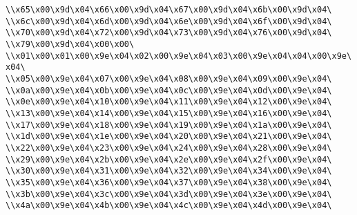 \verb|\\x65\x00\x9d\x04\x66\x00\x9d\x04\x67\x00\x9d\x04\x6b\x00\x9d\x04\|\newline
\verb|\\x6c\x00\x9d\x04\x6d\x00\x9d\x04\x6e\x00\x9d\x04\x6f\x00\x9d\x04\|\newline
\verb|\\x70\x00\x9d\x04\x72\x00\x9d\x04\x73\x00\x9d\x04\x76\x00\x9d\x04\|\newline
\verb|\\x79\x00\x9d\x04\x00\x00\|\newline
\verb|\\x01\x00\x01\x00\x9e\x04\x02\x00\x9e\x04\x03\x00\x9e\x04\x04\x00\x9e\x04\|\newline
\verb|\\x05\x00\x9e\x04\x07\x00\x9e\x04\x08\x00\x9e\x04\x09\x00\x9e\x04\|\newline
\verb|\\x0a\x00\x9e\x04\x0b\x00\x9e\x04\x0c\x00\x9e\x04\x0d\x00\x9e\x04\|\newline
\verb|\\x0e\x00\x9e\x04\x10\x00\x9e\x04\x11\x00\x9e\x04\x12\x00\x9e\x04\|\newline
\verb|\\x13\x00\x9e\x04\x14\x00\x9e\x04\x15\x00\x9e\x04\x16\x00\x9e\x04\|\newline
\verb|\\x17\x00\x9e\x04\x18\x00\x9e\x04\x19\x00\x9e\x04\x1a\x00\x9e\x04\|\newline
\verb|\\x1d\x00\x9e\x04\x1e\x00\x9e\x04\x20\x00\x9e\x04\x21\x00\x9e\x04\|\newline
\verb|\\x22\x00\x9e\x04\x23\x00\x9e\x04\x24\x00\x9e\x04\x28\x00\x9e\x04\|\newline
\verb|\\x29\x00\x9e\x04\x2b\x00\x9e\x04\x2e\x00\x9e\x04\x2f\x00\x9e\x04\|\newline
\verb|\\x30\x00\x9e\x04\x31\x00\x9e\x04\x32\x00\x9e\x04\x34\x00\x9e\x04\|\newline
\verb|\\x35\x00\x9e\x04\x36\x00\x9e\x04\x37\x00\x9e\x04\x38\x00\x9e\x04\|\newline
\verb|\\x3b\x00\x9e\x04\x3c\x00\x9e\x04\x3d\x00\x9e\x04\x3e\x00\x9e\x04\|\newline
\verb|\\x4a\x00\x9e\x04\x4b\x00\x9e\x04\x4c\x00\x9e\x04\x4d\x00\x9e\x04\|\newline

